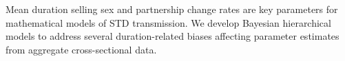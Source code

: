 Mean duration selling sex and partnership change rates
are key parameters for mathematical models of STD transmission.
We develop Bayesian hierarchical models to address
several duration-related biases affecting
parameter estimates from aggregate cross-sectional data.
